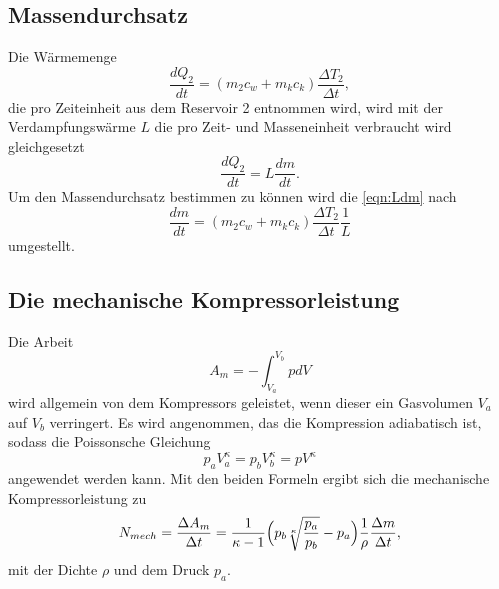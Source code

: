  \subsection{Massendurchsatz} %
 \label{sub:Massendurchsatz}
 Die Wärmemenge 
 \begin{equation}
     \frac{dQ_2}{dt} = (m_2 c_w + m_k c_k)\frac{\Delta T_2}{\Delta t},
     \label{eqn:DeltaQ2}
 \end{equation}
die pro Zeiteinheit aus dem Reservoir 2 entnommen wird,
wird mit der Verdampfungswärme $L$ die pro Zeit- und Masseneinheit verbraucht wird gleichgesetzt
\begin{equation}
    \frac{dQ_2}{dt} = L \frac{dm}{dt}.
    \label{eqn:Ldm}
\end{equation}
Um den Massendurchsatz bestimmen zu können wird die \autoref{eqn:Ldm} nach
\begin{equation}
    \frac{dm}{dt} = (m_2 c_w + m_k c_k)\frac{\Delta T_2}{\Delta t} \frac{1}{L}
    \label{eqn:Massendurchsatz}
\end{equation}
umgestellt.

\subsection{Die mechanische Kompressorleistung} %
\label{sub:Die mechanische Kompressorleistung}
Die Arbeit 
 \begin{equation*}
     A_m = - \int_{V_a}^{V_b} p dV
 \end{equation*}
wird allgemein von dem Kompressors geleistet, wenn dieser ein Gasvolumen $V_a$ auf $V_b$ verringert.
Es wird angenommen, das die Kompression adiabatisch ist, sodass die Poissonsche Gleichung 
 \begin{equation*}
     p_a V_a^{\kappa} = p_b V_b^{\kappa} = p V^{\kappa}
 \end{equation*}
angewendet werden kann.
Mit den beiden Formeln ergibt sich die mechanische Kompressorleistung zu
\begin{equation}
    N_{mech} = \frac{\Delta A_m}{\Delta t} = \frac{1}{\kappa - 1} \Bigl(p_b \sqrt[\kappa]{\frac{p_a}{p_b}}-p_a \Bigr) \frac{1}{\rho}\frac{\Delta m}{\Delta t},
    \label{eqn:Kompressorleistung}
\end{equation}
mit der Dichte $\rho$ und dem Druck $p_a$.
